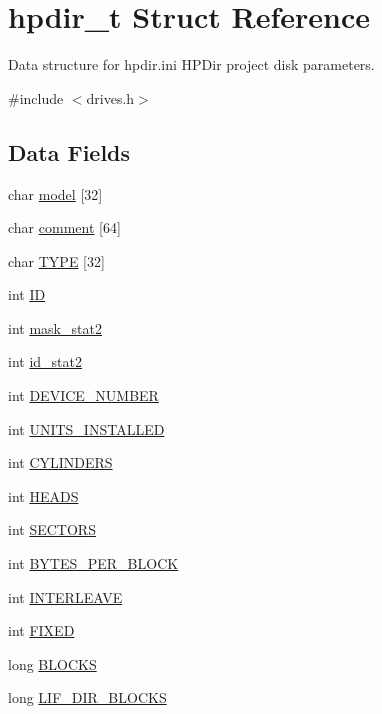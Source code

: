 \hypertarget{structhpdir__t}{}\section{hpdir\+\_\+t Struct Reference}
\label{structhpdir__t}


Data structure for hpdir.\+ini H\+P\+Dir project disk parameters.  




{\ttfamily \#include $<$drives.\+h$>$}

\subsection*{Data Fields}
\begin{DoxyCompactItemize}
\item 
char \hyperlink{structhpdir__t_acf68613aa50c2bd1f14956167c021d88}{model} \mbox{[}32\mbox{]}
\item 
char \hyperlink{structhpdir__t_aa2ba4f9a627c74e84a515e8ac4893bfb}{comment} \mbox{[}64\mbox{]}
\item 
char \hyperlink{structhpdir__t_ad2f925b088d4fd746c9ea789f34f9507}{T\+Y\+PE} \mbox{[}32\mbox{]}
\item 
int \hyperlink{structhpdir__t_afe1c714728ae2b560621b54c5af129a9}{ID}
\item 
int \hyperlink{structhpdir__t_a0d1e30875c8f50d763e06933fc00f4c8}{mask\+\_\+stat2}
\item 
int \hyperlink{structhpdir__t_ac44ef1313054831824d2840202e554aa}{id\+\_\+stat2}
\item 
int \hyperlink{structhpdir__t_a74e34ba48c9b35e0551051ad67cd069a}{D\+E\+V\+I\+C\+E\+\_\+\+N\+U\+M\+B\+ER}
\item 
int \hyperlink{structhpdir__t_a4390cad586b742ba0cb4a479871c5a8c}{U\+N\+I\+T\+S\+\_\+\+I\+N\+S\+T\+A\+L\+L\+ED}
\item 
int \hyperlink{structhpdir__t_afda568f3e8bf184e9e58c4048fda04e7}{C\+Y\+L\+I\+N\+D\+E\+RS}
\item 
int \hyperlink{structhpdir__t_a0fc9ceb850b11adfbcb1f256d628ada0}{H\+E\+A\+DS}
\item 
int \hyperlink{structhpdir__t_ae666c8a13c52affb29d05690bcbcd714}{S\+E\+C\+T\+O\+RS}
\item 
int \hyperlink{structhpdir__t_a5b24f184136dbc60d1c2a9f74dcb2956}{B\+Y\+T\+E\+S\+\_\+\+P\+E\+R\+\_\+\+B\+L\+O\+CK}
\item 
int \hyperlink{structhpdir__t_a329cc03f36e88365e6d7dc87194a1ed4}{I\+N\+T\+E\+R\+L\+E\+A\+VE}
\item 
int \hyperlink{structhpdir__t_aadd83c87e729700a5a688fed3efb2ca5}{F\+I\+X\+ED}
\item 
long \hyperlink{structhpdir__t_a4b4f32c9b9cfe558ce5fbd51d65b5db3}{B\+L\+O\+C\+KS}
\item 
long \hyperlink{structhpdir__t_a8b6c34460bb1c291860bbb82c56660a4}{L\+I\+F\+\_\+\+D\+I\+R\+\_\+\+B\+L\+O\+C\+KS}
\end{DoxyCompactItemize}


